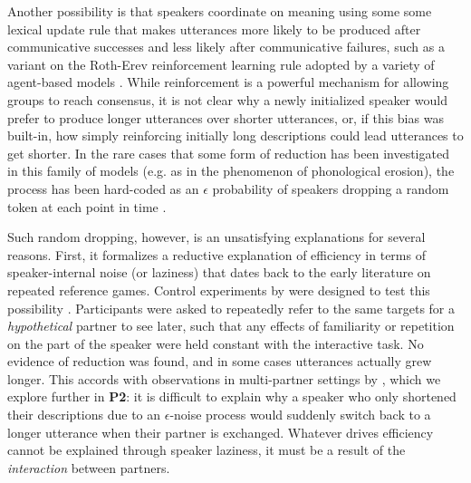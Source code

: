 Another possibility is that speakers coordinate on meaning using some some lexical update rule that makes utterances more likely to be produced after communicative successes and less likely after communicative failures, such as a variant on the Roth-Erev reinforcement learning rule \cite{erev1998predicting} adopted by a variety of agent-based models \cite{steels_self-organizing_1995,barr_establishing_2004,young_evolution_2015}.
While reinforcement is a powerful mechanism for allowing groups to reach consensus, it is not clear why a newly initialized speaker would prefer to produce longer utterances over shorter utterances, or, if this bias was built-in, how simply reinforcing initially long descriptions could lead utterances to get shorter. 
In the rare cases that some form of reduction has been investigated in this family of models (e.g. as in the phenomenon of phonological erosion), the process has been hard-coded as an $\epsilon$ probability of speakers dropping a random token at each point in time \cite{beuls2013agent,steels2016agent}.


Such random dropping, however, is an unsatisfying explanations for several reasons.
First, it formalizes a reductive explanation of efficiency in terms of speaker-internal noise (or laziness) that dates back to the early literature on repeated reference games.
Control experiments by  were designed to test this possibility \cite<see also>{GarrodFayLeeOberlanderMacLeod07_GraphicalSymbolSystems}. 
Participants were asked to repeatedly refer to the same targets for a \emph{hypothetical} partner to see later, such that any effects of familiarity or repetition on the part of the speaker were held constant with the interactive task. 
No evidence of reduction was found, and in some cases utterances actually grew longer.
This accords with observations in multi-partner settings by , which we explore further in \textbf{P2}: it is difficult to explain why a speaker who only shortened their descriptions due to an $\epsilon$-noise process would suddenly switch back to a longer utterance when their partner is exchanged.
Whatever drives efficiency cannot be explained through speaker laziness, it must be a result of the \emph{interaction} between partners.


